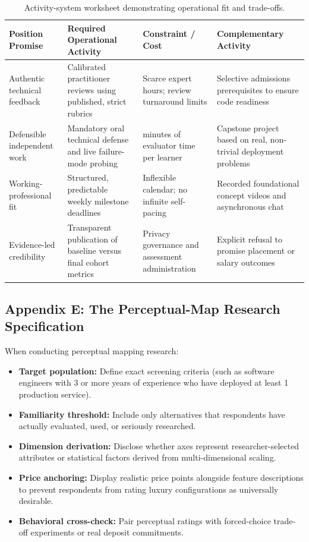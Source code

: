 \begin{table}[t]
\centering
\small
\begin{tabularx}{\textwidth}{>{\raggedright\arraybackslash}p{3.5cm} >{\raggedright\arraybackslash}X >{\raggedright\arraybackslash}p{3cm} >{\raggedright\arraybackslash}X}
\toprule
\textbf{Position Promise} & \textbf{Required Operational Activity} & \textbf{Constraint / Cost} & \textbf{Complementary Activity} \\
\midrule
Authentic technical feedback & Calibrated practitioner reviews using published, strict rubrics & Scarce expert hours; review turnaround limits & Selective admissions prerequisites to ensure code readiness \\
Defensible independent work & Mandatory oral technical defense and live failure-mode probing & 45 minutes of evaluator time per learner & Capstone project based on real, non-trivial deployment problems \\
Working-professional fit & Structured, predictable weekly milestone deadlines & Inflexible calendar; no infinite self-pacing & Recorded foundational concept videos and asynchronous chat \\
Evidence-led credibility & Transparent publication of baseline versus final cohort metrics & Privacy governance and assessment administration & Explicit refusal to promise placement or salary outcomes \\
\bottomrule
\end{tabularx}
\caption{Activity-system worksheet demonstrating operational fit and trade-offs.}
\label{tab:ch8-app-activity-system}
\end{table}

\subsection*{Appendix E: The Perceptual-Map Research Specification}

When conducting perceptual mapping research:
\begin{itemize}
    \item \textbf{Target population:} Define exact screening criteria (such as software engineers with 3 or more years of experience who have deployed at least 1 production service).
    \item \textbf{Familiarity threshold:} Include only alternatives that respondents have actually evaluated, used, or seriously researched.
    \item \textbf{Dimension derivation:} Disclose whether axes represent researcher-selected attributes or statistical factors derived from multi-dimensional scaling.
    \item \textbf{Price anchoring:} Display realistic price points alongside feature descriptions to prevent respondents from rating luxury configurations as universally desirable.
    \item \textbf{Behavioral cross-check:} Pair perceptual ratings with forced-choice trade-off experiments or real deposit commitments.
\end{itemize}

